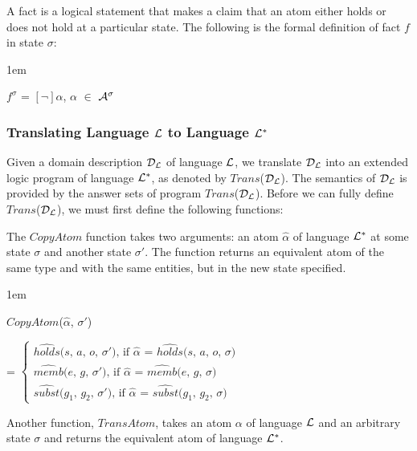 \documentclass[global,twocolumn,draft]{svjour}
\newenvironment{vquote}
  {\begin{list}{}{\leftmargin 1em}\item[]}
  {\end{list}}
\begin{document}
          A fact is a logical statement that makes a claim that an atom either
          holds or does not hold at a particular state. The following is the
          formal definition of fact $f$ in state $\sigma$:

          \begin{vquote}
            $f^{\sigma}$ = $[\lnot]$$\alpha$, $\alpha$ $\in$ ${\cal A}^{\sigma}$
          \end{vquote}

      \subsubsection{Translating Language ${\cal L}$ to Language ${\cal L^{*}}$}

        Given a domain description ${\cal D_{L}}$ of language ${\cal L}$, we
        translate ${\cal D_{L}}$ into an extended logic program of language
        ${\cal L^{*}}$, as denoted by $Trans$(${\cal D_{L}}$). The semantics of
        ${\cal D_{L}}$ is provided by the answer sets of program
        $Trans$(${\cal D_{L}}$). Before we can fully define
        $Trans$(${\cal D}_{\cal L}$), we must first define the following
        functions:

        The $CopyAtom$ function takes two arguments: an atom $\hat{\alpha}$
        of language ${\cal L}^{*}$ at some state $\sigma$ and another state
        $\sigma'$. The function returns an equivalent atom of the same type
        and with the same entities, but in the new state specified.

        \begin{vquote}
          $CopyAtom$($\hat{\alpha}$, $\sigma'$)

          =
          \begin{math}
            \begin{cases}
              \mbox{$\hat{holds}$($s$, $a$, $o$, $\sigma'$), if $\hat{\alpha}$ = $\hat{holds}$($s$, $a$, $o$, $\sigma$)} \\
              \mbox{$\hat{memb}$($e$, $g$, $\sigma'$), if $\hat{\alpha}$ = $\hat{memb}$($e$, $g$, $\sigma$)} \\
              \mbox{$\hat{subst}$($g_{1}$, $g_{2}$, $\sigma'$), if $\hat{\alpha}$ = $\hat{subst}$($g_{1}$, $g_{2}$, $\sigma$)}
            \end{cases}
          \end{math}
        \end{vquote}

        Another function, $TransAtom$, takes an atom $\alpha$ of language
        ${\cal L}$ and an arbitrary state $\sigma$ and returns the equivalent
        atom of language ${\cal L}^{*}$.
\end{document}
